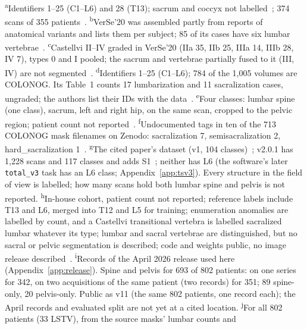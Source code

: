 \begin{table}[h]
\smallskip
\footnotesize
\raggedright
\textsuperscript{a}Identifiers 1--25 (C1--L6) and 28 (T13); sacrum and coccyx not
labelled~\citep{VerSeRepo}; 374 scans of 355 patients~\citep{Sekuboyina2021VerSe:Images}.
\textsuperscript{b}VerSe'20 was assembled partly from reports of anatomical variants and
lists them per subject; 85 of its cases have six lumbar vertebrae~\citep{Liebl2021VerSeData}.
\textsuperscript{c}Castellvi II--IV graded in VerSe'20 (IIa 35, IIb 25, IIIa 14, IIIb 28,
IV 7), types 0 and I pooled; the sacrum and vertebrae partially fused to it (III, IV) are
not segmented~\citep{Liebl2021VerSeData}.
\textsuperscript{d}Identifiers 1--25 (C1--L6); 784 of the 1{,}005 volumes are COLONOG.
Its Table~1 counts 17 lumbarization and 11 sacralization cases, ungraded; the authors list
their IDs with the data~\citep{Deng2021CTSpine1K:Tomography}.
\textsuperscript{e}Four classes: lumbar spine (one class), sacrum, left and right hip, on
the same scan, cropped to the pelvic region; patient count not
reported~\citep{Liu2021DeepModels}.
\textsuperscript{f}Undocumented tags in ten of the 713 COLONOG mask filenames on Zenodo:
sacralization 7, semisacralization 2, hard\_sacralization 1~\citep{Liu2020CTPelvic1KData,Schwing2026CTSpinoPelvic1KArxiv}.
\textsuperscript{g}The cited paper's dataset (v1, 104 classes)~\citep{Wasserthal2023TotalSegmentator:Images,Wasserthal2022TSDatasetV1};
v2.0.1 has 1{,}228 scans and 117 classes and adds
S1~\citep{Wasserthal2023TSDatasetV2,TotalSegmentatorCode}; neither has L6 (the software's
later \texttt{total\_v3} task has an L6 class; Appendix~\ref{app:tsv3}). Every
structure in the field of view is labelled; how many scans hold both lumbar spine and
pelvis is not reported.
\textsuperscript{h}In-house cohort, patient count not reported; reference labels include
T13 and L6, merged into T12 and L5 for training; enumeration anomalies are labelled by
count, and a Castellvi transitional vertebra is labelled sacralized lumbar whatever its type;
lumbar and sacral vertebrae are distinguished, but no sacral or pelvic segmentation is
described; code and weights public, no image release
described~\citep{Moller2026VERIDAH:Sequences}.
\textsuperscript{i}Records of the April 2026 release used here (Appendix~\ref{app:release}).
Spine and pelvis for 693 of 802 patients: on one series for 342, on two acquisitions of the
same patient (two records) for 351; 89 spine-only, 20 pelvis-only. Public as v11 (the same
802 patients, one record each); the April records and evaluated split are not yet at a
cited location.
\textsuperscript{j}For all 802 patients (33 LSTV), from the source masks' lumbar counts and

\end{table}
